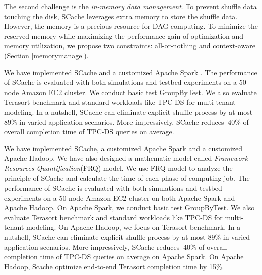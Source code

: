 The second challenge is the \textit{in-memory data management}. To prevent shuffle data touching the disk, SCache leverages extra memory to store the shuffle data. However, the memory is a precious resource for DAG computing. To minimize the reserved memory while maximizing the performance gain of optimization and memory utilization, we propose two constraints: all-or-nothing and context-aware (Section \ref{memorymanage}).

{\color{red}
We have implemented SCache and a customized Apache Spark \cite{apachespark}. The performance of SCache is evaluated with both simulations and testbed experiments on a 50-node Amazon EC2 cluster. We conduct basic test GroupByTest. We also evaluate Terasort \cite{spark-tera} benchmark and standard workloads like TPC-DS \cite{tpcds} for multi-tenant modeling. In a nutshell, SCache can eliminate explicit shuffle process by at most $89\%$ in varied application scenarios. More impressively, SCache reduces $~40\%$ of overall completion time of TPC-DS queries on average.
}

{\color{blue}
We have implemented SCache, a customized Apache Spark \cite{apachespark} and a customized Apache Hadoop. We have also designed a mathematic model called \textit{Framework Resources Quantification}(FRQ) model. We use FRQ model to analyze the principle of SCache and calculate the time of each phase of computing job. The performance of SCache is evaluated with both simulations and testbed experiments on a 50-node Amazon EC2 cluster on both Apache Spark and Apache Hadoop. On Apache Spark, we conduct basic test GroupByTest. We also evaluate Terasort \cite{spark-tera} benchmark and standard workloads like TPC-DS \cite{tpcds} for multi-tenant modeling. On Apache Hadoop, we focus on Terasort benchmark. In a nutshell, SCache can eliminate explicit shuffle process by at most $89\%$ in varied application scenarios. More impressively, SCache reduces $~40\%$ of overall completion time of TPC-DS queries on average on Apache Spark. On Apache Hadoop, Scache optimize end-to-end Terasort completion time by 15\%.
}